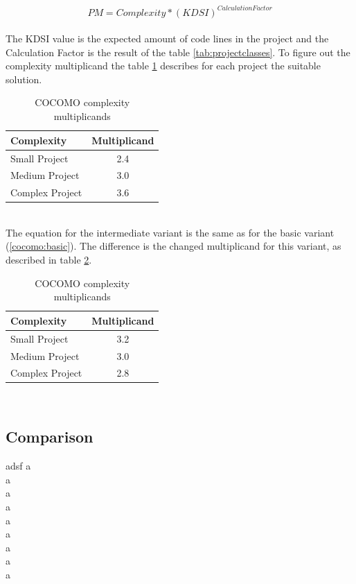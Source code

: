 \begin{equation}
PM = Complexity * (KDSI)^{Calculation Factor} \label{cocomo:basic}
\end{equation}\\
The KDSI value is the expected amount of code lines in the project and the Calculation Factor is the result of the table \ref{tab:projectclasses}. To figure out the complexity multiplicand the table \ref{cocomo:basicComplexity} describes for each project the suitable solution.\\
\begin{table}[h]
	\centering 
	\setlength{\tabcolsep}{4pt}
	\begin{tabular}{|l||c|}\hline
		Complexity	& Multiplicand\\ \hline\hline
		Small Project   	& 2.4        		\\ \hline
		Medium Project 		& 3.0        		\\ \hline
		Complex Project 	& 3.6 			\\ \hline
	\end{tabular} 
	\caption{COCOMO complexity multiplicands} 
	\label{cocomo:basicComplexity} 
\end{table}\\
The equation for the intermediate variant is the same as for the basic variant (\ref{cocomo:basic}). The difference is the changed multiplicand for this variant, as described in table \ref{cocomo:intermediateComplexity}.
\begin{table}[h]
	\centering 
	\setlength{\tabcolsep}{4pt}
	\begin{tabular}{|l||c|}\hline
		Complexity	& Multiplicand\\ \hline\hline
		Small Project   	& 3.2        		\\ \hline
		Medium Project 		& 3.0        		\\ \hline
		Complex Project 	& 2.8 			\\ \hline
	\end{tabular} 
	\caption{COCOMO complexity multiplicands} 
	\label{cocomo:intermediateComplexity} 
\end{table}\\

\subsection{Comparison}

adsf
a\\
a\\
a\\
a\\
a\\
a\\
a\\
a\\
a

